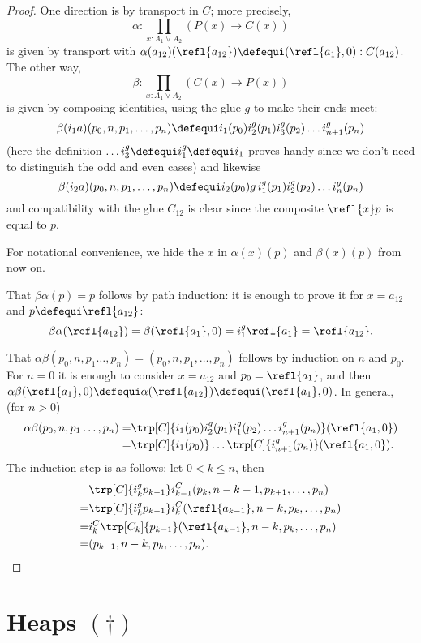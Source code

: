 \begin{proof}
One direction is by transport in $C$; more precisely,
$$\alpha:\prod_{x:A_1\vee A_2}(P(x)\to C(x))$$ is given by transport with $\alpha(a_{12})(\refl{a_{12}})\defequi(\refl{a_{1}},0):C(a_{12})$.
The other way,
$$\beta:\prod_{x:A_1\vee A_2}(C(x)\to P(x))$$ is given by composing identities, using the glue $g$ to make their ends meet:
$$\beta(i_1a)(p_0,n,p_1,\dots,p_n)\defequi i_1(p_0)i_2^g(p_1)i_3^g(p_2) \dots i_{n+1}^g(p_n)$$
(here the definition $\dots i_3^g\defequi i_1^g\defequi i_1$ proves handy since we don't need to distinguish the odd and even cases)
and likewise
$$\beta(i_2a)(p_0,n,p_1,\dots,p_n)\defequi i_2(p_0)g\,i_1^g(p_1)i_2^g(p_2) \dots i_{n}^g(p_n)$$ and compatibility with the glue $C_{12}$ is clear since the composite $\refl{x}p$ is equal to $p$.

For notational convenience, we hide the $x$ in $\alpha(x)(p)$ and $\beta(x)(p)$ from now on.

That $\beta\alpha(p)=p$ follows by path induction: it is enough to prove it for $x=a_{12}$ and
$p\defequi\refl{a_{12}}$:
$$\beta\alpha(\refl{a_{12}})=\beta(\refl{a_1},0)=i_1^g\refl{a_1}=\refl{a_{12}}.$$

That $\alpha\beta(p_0,n,p_1\dots,p_n)=(p_0,n,p_1,\dots,p_n)$ follows by induction on $n$ and $p_0$.  For $n=0$ it is enough to consider  $x=a_{12}$ and $p_0=\refl{a_1}$, and then
$\alpha\beta(\refl{a_1},0)\defequi\alpha(\refl{a_{12}})\defequi(\refl{a_1},0)$.  In general, (for $n>0$)
\begin{align*}
  \alpha\beta(p_0,n,p_1\dots,p_n)
=&\trp[C]{i_1(p_0)i_2^g(p_1)i_1^g(p_2) \dots i_{n+1}^g(p_n)}(\refl{a_1,0})\\
=&\trp[C]{i_1(p_0)}\dots\trp[C]{i_{n+1}^g(p_n)}(\refl{a_1,0}).
\end{align*}
  The induction step is as follows: let $0< k\leq n$, then
\begin{align*}
  &\trp[C]{i_k^gp_{k-1}}i^C_{k-1}(p_k,n-k-1,p_{k+1},\dots,p_n)\\
  =&\trp[C]{i_k^gp_{k-1}}i^C_k(\refl{a_{k-1}},n-k,p_k,\dots,p_n)\\
  =&i^C_k\trp[C_k]{p_{k-1}}(\refl{a_{k-1}},n-k,p_k,\dots,p_n)\\
  =&(p_{k-1},n-k,p_k,\dots,p_n).
\end{align*}
\end{proof}

\section{Heaps \texorpdfstring{$(\dagger)$}{(\textdagger) \color{red} just moved from symmetry without proofreading BID211116}}
\label{sec:heaps}

